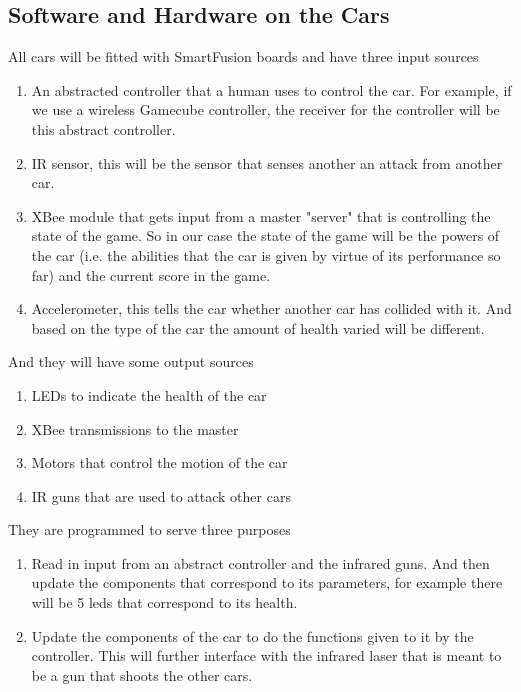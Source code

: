 \documentclass{article}
\begin{document}
\subsection{Software and Hardware on the Cars}
All cars will be fitted with SmartFusion boards and have three input sources
\begin{enumerate}
    \item An abstracted controller that a human uses to control the car.  For
    example, if we use a wireless Gamecube controller, the receiver for the
    controller will be this abstract controller.
    \item IR sensor, this will be the sensor that senses another an attack
    from another car.
    \item XBee module that gets input from a master "server" that is
    controlling the state of the game.  So in our case the state of the game
    will be the powers of the car (i.e.  the abilities that the car is given
    by virtue of its performance so far) and the current score in the game. 
    \item Accelerometer, this tells the car whether another car has collided
    with it.  And based on the type of the car the amount of health varied
    will be different.
\end{enumerate}

And they will have some output sources
\begin{enumerate}
    \item LEDs to indicate the health of the car
    \item XBee transmissions to the master
    \item Motors that control the motion of the car
    \item IR guns that are used to attack other cars
\end{enumerate}

They are programmed to serve three purposes
\begin{enumerate}
    \item Read in input from an abstract controller and the infrared guns.
    And then update the components that correspond to its parameters, for
    example there will be 5 leds that correspond to its health.
    \item Update the components of the car to do the functions given to it by
    the controller.  This will further interface with the infrared laser that
    is meant to be a gun that shoots the other cars.
\end{enumerate}
\end{document}
